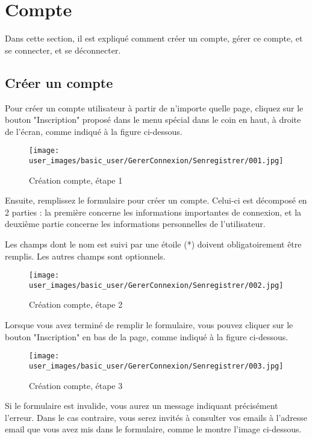 \section{Compte}

Dans cette section, il est expliqué comment créer un compte, gérer ce compte, et se connecter, et se déconnecter.

\subsection{Créer un compte}

Pour créer un compte utilisateur à partir de n'importe quelle page, cliquez sur le bouton "Inscription" proposé dans le menu spécial dans le coin en haut, à droite de l'écran, comme indiqué à la figure ci-dessous.

\begin{figure}[H]
\centering
\texttt{[image: user\_images/basic\_user/GererConnexion/Senregistrer/001.jpg]}
\caption{Création compte, étape 1}
\end{figure}

Ensuite, remplissez le formulaire pour créer un compte. Celui-ci est décomposé en 2 parties : la première concerne les informations importantes de connexion, et la deuxième partie concerne les informations personnelles de l'utilisateur. \newline

Les champs dont le nom est suivi par une étoile (*) doivent obligatoirement être remplis. Les autres champs sont optionnels.

\begin{figure}[H]
\centering
\texttt{[image: user\_images/basic\_user/GererConnexion/Senregistrer/002.jpg]}
\caption{Création compte, étape 2}
\end{figure}

Lorsque vous avez terminé de remplir le formulaire, vous pouvez cliquer sur le bouton "Inscription" en bas de la page, comme indiqué à la figure ci-dessous.

\begin{figure}[H]
\centering
\texttt{[image: user\_images/basic\_user/GererConnexion/Senregistrer/003.jpg]}
\caption{Création compte, étape 3}
\end{figure}

Si le formulaire est invalide, vous aurez un message indiquant précisément l'erreur. Dans le cas contraire, vous serez invités à consulter vos emails à l'adresse email que vous avez mis dans le formulaire, comme le montre l'image ci-dessous.

